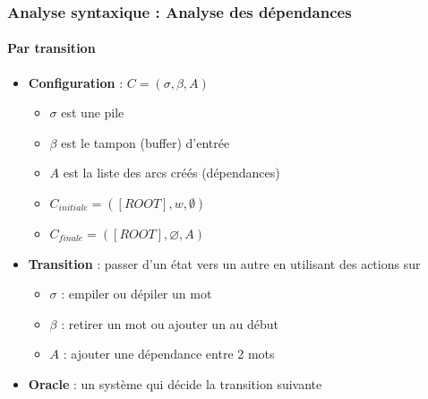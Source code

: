 \documentclass[xcolor=table]{beamer}
\begin{document}
\begin{frame}
\frametitle{Analyse syntaxique : Analyse des dépendances}
\framesubtitle{Par transition}

\begin{minipage}{.6\textwidth}
	\begin{itemize}
		\item \textbf{Configuration} :  $C = (\sigma, \beta, A)$
		\begin{itemize}
			\item $\sigma$ est une pile
			\item $\beta$ est le tampon (buffer) d'entrée
			\item $A$ est la liste des arcs créés (dépendances)
			\item $C_{initiale} = ([ROOT], w, \emptyset)$
			\item $C_{finale} = ([ROOT], \varnothing, A)$
		\end{itemize}
	\end{itemize}
\end{minipage}
\begin{minipage}{.38\textwidth}
\end{minipage}

\begin{itemize}
	\item \textbf{Transition} : passer d'un état vers un autre en utilisant des actions sur
	\begin{itemize}
		\item $\sigma$ : empiler ou dépiler un mot
		\item $\beta$ : retirer un mot ou ajouter un au début
		\item $A$ : ajouter une dépendance entre 2 mots
	\end{itemize}
	\item \textbf{Oracle} : un système qui décide la transition suivante
\end{itemize}

\end{frame}
\end{document}
